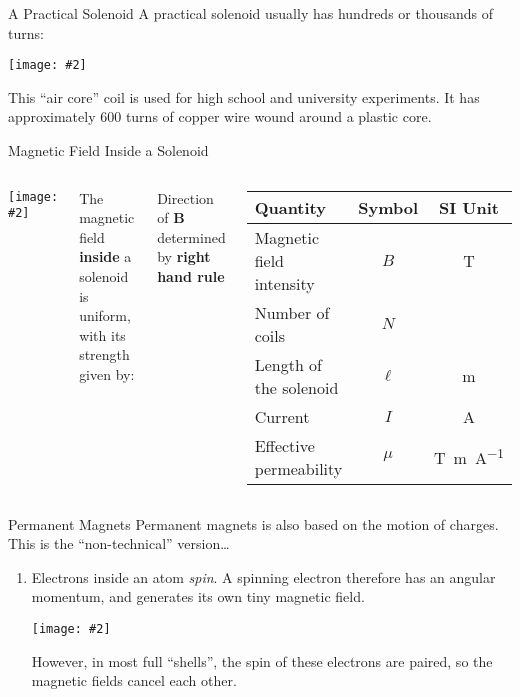 \documentclass[12pt,aspectratio=169]{beamer}
\newcommand{\pic}[2]{\texttt{[image: \#2]}}
\newcommand{\mb}[1]{\mathbf{#1}}
\newcommand{\eq}[2]{\vspace{#1}{\Large\begin{displaymath}#2\end{displaymath}}}
\begin{document}
\begin{frame}{A Practical Solenoid}
  A practical solenoid usually has hundreds or thousands of turns:
  \begin{center}
    \pic{.45}{1020201515330450255}
  \end{center}

  \vspace{-.2in}
  This ``air core'' coil is used for high school and university experiments. It
  has approximately 600 turns of copper wire wound around a plastic core.
\end{frame}

\begin{frame}{Magnetic Field Inside a Solenoid}
  \begin{columns}
    \pic{1}{magneticfield4}
    
    The magnetic field \textbf{inside} a solenoid is uniform, with its strength
    given by:
    
    \eq{-.2in}{
      \boxed{B=\frac{\mu NI}{\ell}}
    }
    
    Direction of $\mb{B}$ determined by \textbf{right hand rule}
    \begin{center}
      \begin{tabular}{l|c|c}
        \rowcolor{pink}
        \textbf{Quantity} & \textbf{Symbol} & \textbf{SI Unit} \\ \hline
        Magnetic field intensity & $B$    & \si{\tesla} \\
        Number of coils          & $N$    & \\
        Length of the solenoid   & $\ell$ & \si{\metre}\\
        Current                  & $I$    & \si{\ampere}\\
        Effective permeability   & $\mu$  & \si{\tesla\metre\per\ampere}
      \end{tabular}
    \end{center}
  \end{columns}
\end{frame}



\begin{frame}{Permanent Magnets}
  Permanent magnets is also based on the motion of charges. This is the
  ``non-technical'' version\ldots

  \begin{enumerate}
  \item Electrons inside an atom \emph{spin}. A spinning electron therefore has
    an angular momentum, and generates its own tiny magnetic field.
    \begin{center}
      \pic{.3}{Electron-spin}
    \end{center}
    However, in most full ``shells'', the spin of these electrons are paired,
    so the magnetic fields cancel each other.
  \end{enumerate}
\end{frame}
\end{document}
